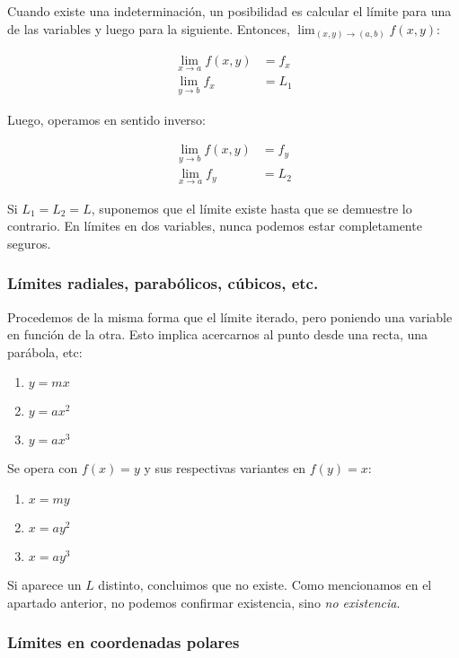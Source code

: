 Cuando existe una indeterminación, un posibilidad es calcular el límite para una
de las variables y luego para la siguiente. 
Entonces, \(\lim_{(x,y) \to (a,b)} f(x,y)\):

\begin{align*}
    \lim_{x \to a} f(x,y) & = f_x \\
    \lim_{y \to b} f_x & = \boxed{L_1}
\end{align*}

Luego, operamos en sentido inverso:

\begin{align*}
    \lim_{y \to b} f(x,y) & = f_y \\
    \lim_{x \to a} f_y & = \boxed{L_2}
\end{align*}

Si \(L_1 = L_2 = L\), suponemos que el límite existe hasta que se demuestre lo 
contrario. En límites en dos variables, nunca podemos estar completamente 
seguros.

\subsubsection{Límites radiales, parabólicos, cúbicos, etc.}

Procedemos de la misma forma que el límite iterado, pero poniendo una variable 
en función de la otra. Esto implica acercarnos al punto desde una recta, una 
parábola, etc:

\begin{enumerate}
    \item \(y = mx\)
    \item \(y = ax^{2}\)
    \item \(y = ax^{3}\)
\end{enumerate}

Se opera con \(f(x) = y\) y sus respectivas variantes en \(f(y) = x\):

\begin{enumerate}
    \item \(x = my\)
    \item \(x = ay^{2}\)
    \item \(x = ay^{3}\)
\end{enumerate}

Si aparece un \(L\) distinto, concluimos que no existe. Como mencionamos en el 
apartado anterior, no podemos confirmar existencia, sino \textit{no existencia}.

\subsubsection{Límites en coordenadas polares}

